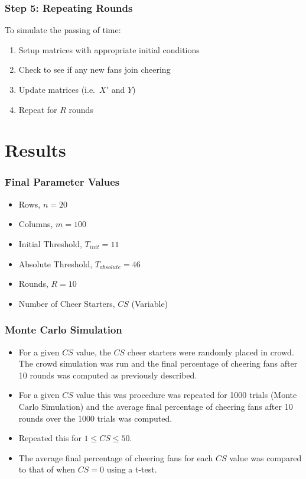 \documentclass[compress,handout,10pt]{beamer}
\let\olditem\item
\renewcommand{\item}{\setlength{\itemsep}{0.5\baselineskip}\olditem}
\begin{document}
\begin{frame}
\frametitle{Step 5: Repeating Rounds}
To simulate the passing of time:
	\begin {enumerate}
		\item Setup matrices with appropriate initial conditions
		\item Check to see if any new fans join cheering
		\item Update matrices (i.e.~$X'$ and $Y$)
		\item Repeat for $R$ rounds
	\end {enumerate}
\end{frame}

\section{Results}

\begin{frame}
	\frametitle{Final Parameter Values}
	\begin{itemize}
		\item Rows, $n=20$
		\item Columns, $m=100$
		\item Initial Threshold, $T_{init}=11$
		\item Absolute Threshold, $T_{absolute}=46$
		\item Rounds, $R=10$
		\item Number of Cheer Starters, $CS$ (Variable)
	\end{itemize}
\end{frame}

\begin{frame}
	\frametitle{Monte Carlo Simulation}
	\begin{itemize}
		\item For a given $CS$ value, the $CS$ cheer starters were randomly placed in crowd. The crowd simulation was run and the final percentage of cheering fans after 10 rounds was computed as previously described.
		\item For a given $CS$ value this was procedure was repeated for 1000 trials (Monte Carlo Simulation) and the average final percentage of cheering fans after 10 rounds over the 1000 trials was computed. 
		\item Repeated this for $1 \leq CS \leq 50$.
		\item The average final percentage of cheering fans for each $CS$ value was compared to that of when $CS=0$ using a t-test. 
	\end{itemize}
\end{frame}
\end{document}
